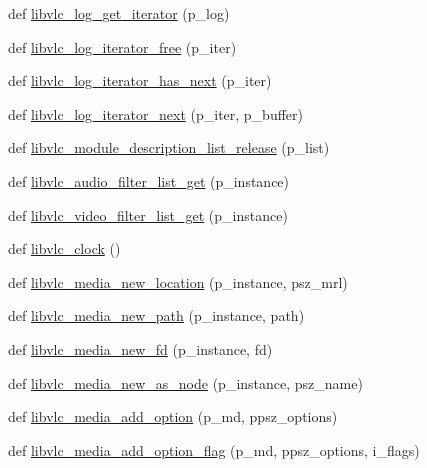 \begin{DoxyCompactItemize}
\item 
def \hyperlink{namespacesrc_1_1lib_1_1vlc_a134efe760dea1444e177ee587fe8d0c5}{libvlc\+\_\+log\+\_\+get\+\_\+iterator} (p\+\_\+log)
\item 
def \hyperlink{namespacesrc_1_1lib_1_1vlc_ae4b362833bcf0f9f8f5372ecf9caca87}{libvlc\+\_\+log\+\_\+iterator\+\_\+free} (p\+\_\+iter)
\item 
def \hyperlink{namespacesrc_1_1lib_1_1vlc_a09687c06fdffde002eb2c370b7d95f3d}{libvlc\+\_\+log\+\_\+iterator\+\_\+has\+\_\+next} (p\+\_\+iter)
\item 
def \hyperlink{namespacesrc_1_1lib_1_1vlc_a0b93583de5f17d70cec67f30e443a9d6}{libvlc\+\_\+log\+\_\+iterator\+\_\+next} (p\+\_\+iter, p\+\_\+buffer)
\item 
def \hyperlink{namespacesrc_1_1lib_1_1vlc_af21d2b1044b2114cb8a663faf0dd379f}{libvlc\+\_\+module\+\_\+description\+\_\+list\+\_\+release} (p\+\_\+list)
\item 
def \hyperlink{namespacesrc_1_1lib_1_1vlc_a2cbaddfaf5362af493a89e5c928b1105}{libvlc\+\_\+audio\+\_\+filter\+\_\+list\+\_\+get} (p\+\_\+instance)
\item 
def \hyperlink{namespacesrc_1_1lib_1_1vlc_a6d7461c340362bc75976d36dd0accfd6}{libvlc\+\_\+video\+\_\+filter\+\_\+list\+\_\+get} (p\+\_\+instance)
\item 
def \hyperlink{namespacesrc_1_1lib_1_1vlc_a4dd533eb81fe257c20adb5aa30ca3c8f}{libvlc\+\_\+clock} ()
\item 
def \hyperlink{namespacesrc_1_1lib_1_1vlc_ad18341226c429f31b52234f520b017ee}{libvlc\+\_\+media\+\_\+new\+\_\+location} (p\+\_\+instance, psz\+\_\+mrl)
\item 
def \hyperlink{namespacesrc_1_1lib_1_1vlc_af966789947721d74b16714fc82e37cf6}{libvlc\+\_\+media\+\_\+new\+\_\+path} (p\+\_\+instance, path)
\item 
def \hyperlink{namespacesrc_1_1lib_1_1vlc_a1f5ce732dda8c7c0bd35dd181e917d1c}{libvlc\+\_\+media\+\_\+new\+\_\+fd} (p\+\_\+instance, fd)
\item 
def \hyperlink{namespacesrc_1_1lib_1_1vlc_a14d4bca72af99a1d749b28fa4779d735}{libvlc\+\_\+media\+\_\+new\+\_\+as\+\_\+node} (p\+\_\+instance, psz\+\_\+name)
\item 
def \hyperlink{namespacesrc_1_1lib_1_1vlc_a5705a17251741ef49b176339c9939d2d}{libvlc\+\_\+media\+\_\+add\+\_\+option} (p\+\_\+md, ppsz\+\_\+options)
\item 
def \hyperlink{namespacesrc_1_1lib_1_1vlc_a884a91bfb12169ffb8abab0dc5be5a21}{libvlc\+\_\+media\+\_\+add\+\_\+option\+\_\+flag} (p\+\_\+md, ppsz\+\_\+options, i\+\_\+flags)

\end{DoxyCompactItemize}
